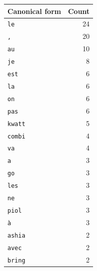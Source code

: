 \begin{tabular}{@{}lr@{}}
\toprule
\textbf{Canonical form} & \textbf{Count} \\
\midrule
\texttt{le} & 24 \\
\texttt{,} & 20 \\
\texttt{au} & 10 \\
\texttt{je} & 8 \\
\texttt{est} & 6 \\
\texttt{la} & 6 \\
\texttt{on} & 6 \\
\texttt{pas} & 6 \\
\texttt{kwatt} & 5 \\
\texttt{combi} & 4 \\
\texttt{va} & 4 \\
\texttt{a} & 3 \\
\texttt{go} & 3 \\
\texttt{les} & 3 \\
\texttt{ne} & 3 \\
\texttt{piol} & 3 \\
\texttt{à} & 3 \\
\texttt{ashia} & 2 \\
\texttt{avec} & 2 \\
\texttt{bring} & 2 \\
\bottomrule
\end{tabular}
